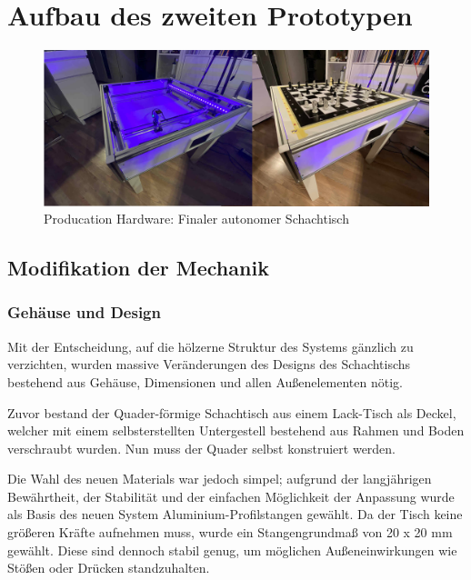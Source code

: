 \hypertarget{aufbau-des-zweiten-prototypen}{%
\chapter{Aufbau des zweiten
Prototypen}\label{aufbau-des-zweiten-prototypen}}

\begin{figure}
\centering
\includegraphics{images/table_images/prod.png}
\caption{Producation Hardware: Finaler autonomer Schachtisch
\label{prod}}
\end{figure}

\hypertarget{modifikation-der-mechanik}{%
\section{Modifikation der Mechanik}\label{modifikation-der-mechanik}}

\hypertarget{gehuxe4use-und-design}{%
\subsection{Gehäuse und Design}\label{gehuxe4use-und-design}}

Mit der Entscheidung, auf die hölzerne Struktur des Systems gänzlich zu
verzichten, wurden massive Veränderungen des Designs des Schachtischs
bestehend aus Gehäuse, Dimensionen und allen Außenelementen nötig.

Zuvor bestand der Quader-förmige Schachtisch aus einem Lack-Tisch als
Deckel, welcher mit einem selbsterstellten Untergestell bestehend aus
Rahmen und Boden verschraubt wurden. Nun muss der Quader selbst
konstruiert werden.

Die Wahl des neuen Materials war jedoch simpel; aufgrund der
langjährigen Bewährtheit, der Stabilität und der einfachen Möglichkeit
der Anpassung wurde als Basis des neuen System Aluminium-Profilstangen
gewählt. Da der Tisch keine größeren Kräfte aufnehmen muss, wurde ein
Stangengrundmaß von 20 x 20 mm gewählt. Diese sind dennoch stabil genug,
um möglichen Außeneinwirkungen wie Stößen oder Drücken standzuhalten.

